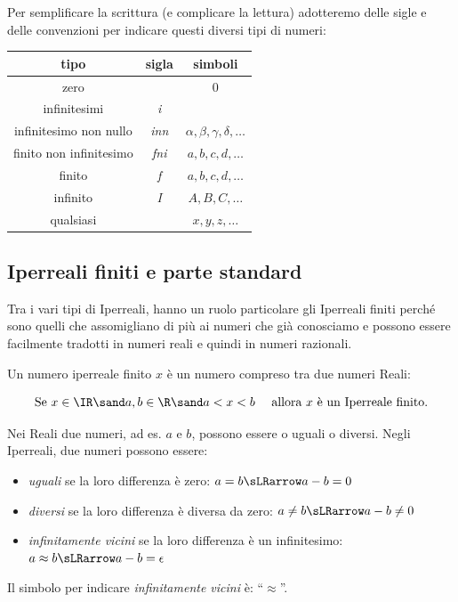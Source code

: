 Per semplificare la scrittura (e complicare la lettura) adotteremo delle 
sigle e delle convenzioni per indicare questi diversi tipi di numeri:

\begin{center}
\begin{tabular}{ccc}\toprule
tipo & sigla & simboli \\\midrule

zero &  & 0 \\

infinitesimi & \emph{i} & \\

infinitesimo non nullo & \emph{inn} & 
\(\alpha, \beta, \gamma, \delta, \dots\) \\

finito non infinitesimo & \emph{fni} & \(a, b, c, d, \dots\)\\

finito & \emph{f} & \(a, b, c, d, \dots\) \\

infinito & \emph{I} & \(A, B, C, \dots\)\\

qualsiasi &  & \(x, y, z, \dots\) \\\bottomrule
\end{tabular}
\label{tab:insnum_tipi}
\end{center}



\subsection{Iperreali finiti e parte standard}
\label{subsec:insnum_partestandard}

Tra i vari tipi di Iperreali, hanno un ruolo particolare gli Iperreali 
finiti perché sono quelli che assomigliano di più ai numeri che già 
conosciamo e possono essere facilmente tradotti in numeri reali e quindi in 
numeri razionali. 

\begin{definizione}
 Un numero iperreale finito $x$ è un numero compreso tra due numeri Reali:

\[\text{Se } x \in \IR \sand a, b \in \R \sand 
  a < x < b \quad \text{ allora } x \text{ è un Iperreale finito.}\]
\end{definizione}

Nei Reali due numeri, ad es. \(a\) e \(b\), possono essere o uguali o 
diversi. 
Negli Iperreali, due numeri possono essere:
\begin{itemize} [noitemsep]
 \item \emph{uguali} se la loro differenza è zero: \quad
 \(a = b \sLRarrow a-b = 0\)
 \item \emph{diversi} se la loro differenza è diversa da zero: \quad 
 \(a \ne b \sLRarrow a-b \ne 0\)
 \item \emph{infinitamente vicini} se la loro differenza è un infinitesimo: 
\quad 
 \(a \approx b \sLRarrow a-b = \epsilon\)
\end{itemize}
Il simbolo per indicare \emph{infinitamente vicini}  è: ``\(\approx\)''.


